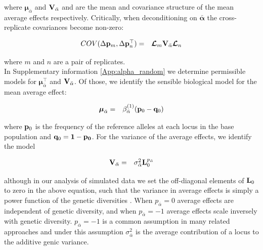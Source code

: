 \documentclass[12pt]{article}
\begin{document}
\begin{bibunit}
where $\boldsymbol{\mu}_{\bar{\alpha}}$ and ${\bf V}_{\bar{\alpha}}$ and are the mean and covariance  structure of the mean average effects respectively. Critically, when deconditioning on $\bar{\boldsymbol{\alpha}}$ the cross-replicate covariances become non-zero:

\begin{equation}
\begin{array}{rl}
COV(\Delta {\bf p}_m, \Delta {\bf p}_n^{\top})
=&\boldsymbol{\mathcal{L}}_m{\bf V}_{\bar{\alpha}}\boldsymbol{\mathcal{L}}_n\\
\end{array}
\label{eq:covdelta}
\end{equation}

where $m$ and $n$ are a pair of replicates.\\ 

In Supplementary information \ref{App:alpha_random} we determine permissible models for $\boldsymbol{\mu}_{\bar{\alpha}}^{\top}$ and ${\bf V}_{\bar{\alpha}}$.  Of those, we identify the sensible biological model for the mean average effect:

\begin{equation} 
\begin{array}{rl}
\boldsymbol{\mu}_{\bar{\alpha}} = & \beta^{(1)}_{\bar{\alpha}}({\bf p}_{0}-{\bf q}_{0})
\end{array}
\end{equation}

where ${\bf p}_{0}$ is the frequency of the reference alleles at each locus in the base population and ${\bf q}_{0}=\bf{1}-{\bf p}_{0}$. For the variance of the average effects, we identify the model 

\begin{equation} 
\begin{array}{rl}
{\bf V}_{\bar{\alpha}}=& \sigma^2_{\bar{\alpha}}{\bf L}_{0}^{p_{\bar{\alpha}}}
\end{array}
\end{equation}

although in our analysis of simulated data we set the off-diagonal elements of ${\bf L}_{0}$ to zero in the above equation, such that the variance in average effects is simply a power function of the genetic diversities \citep{zeng2018signatures}. When $p_{\bar{\alpha}}=0$ average effects are independent of genetic diversity, and when $p_{\bar{\alpha}}=-1$ average effects scale inversely with genetic diversity. $p_{\bar{\alpha}}=-1$ is a common assumption in many related approaches \citep[e.g.][]{yang2011gcta} and under this assumption $\sigma^2_{\bar{\alpha}}$ is the average contribution of a locus to the additive genic variance.


\end{bibunit}
\end{document}
